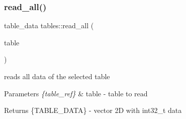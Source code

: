 \subsubsection{\texorpdfstring{read\+\_\+all()}{read\_all()}}
{\footnotesize\ttfamily table\+\_\+data tables\+::read\+\_\+all (\begin{DoxyParamCaption}\item[{\hyperlink{structtable__ref}{table\+\_\+ref}}]{table }\end{DoxyParamCaption})}



reads all data of the selected table 


\begin{DoxyParams}{Parameters}
{\em \{table\+\_\+ref\}} & table -\/ table to read \\
\hline
\end{DoxyParams}
\begin{DoxyReturn}{Returns}
\{T\+A\+B\+L\+E\+\_\+\+D\+A\+TA\} -\/ vector 2D with int32\+\_\+t data 
\end{DoxyReturn}
